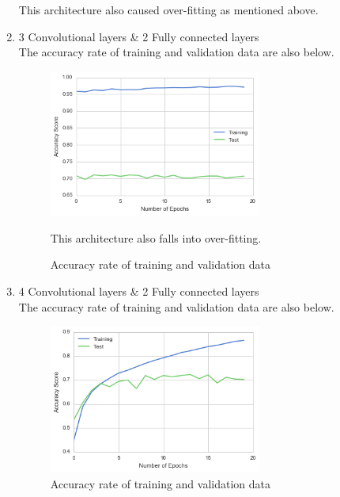 \begin{enumerate}
\begin{figure}[H]
\end{figure}

This architecture also caused over-fitting as mentioned above.

 \item 3 Convolutional layers \& 2 Fully connected layers \\
 The accuracy rate of training and validation data are also below.
 
 \begin{figure}[H]

	\begin{center}
	\includegraphics[width=7cm]{picture/3layer_cnn.png}
	\caption{Accuracy rate of training and validation data}
	\end{center}
	\label{fig:ten}

This architecture also falls into over-fitting.

\end{figure}
 \item 4 Convolutional layers \& 2 Fully connected layers \\
 The accuracy rate of training and validation data are also below.
 
 \begin{figure}[H]

	\begin{center}
	\includegraphics[width=7cm]{picture/4layer_cnn.png}
	\caption{Accuracy rate of training and validation data}
	\end{center}
	\label{fig:eleven}

\end{figure}
\end{enumerate}


